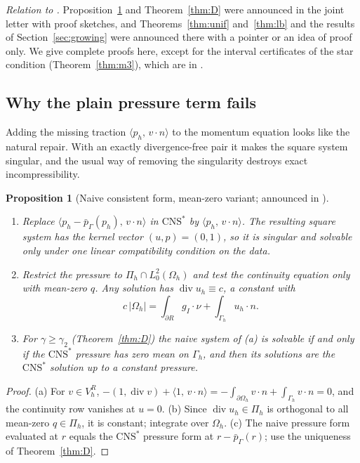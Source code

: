 \documentclass[pdflatex,sn-mathphys-num]{sn-jnl}
\theoremstyle{thmstyleone}
\newtheorem{proposition}[theorem]{Proposition}
\theoremstyle{thmstylethree}
\newcommand{\Gh}{\Gamma_h}
\newcommand{\Oh}{\Omega_h}
\newcommand{\VR}{V_h^R}
\newcommand{\Pih}{\Pi_h}
\newcommand{\gI}{g_I}
\newcommand{\pbG}{\bar p_{\Gamma}}
\newcommand{\ip}[2]{\langle #1,\, #2\rangle}
\newcommand{\CNS}{\mathrm{CNS}^\ast}
\renewcommand{\div}{\operatorname{div}}
\begin{document}
\emph{Relation to \cite{CavalcantePadhiLetter}.} Proposition~\ref{prop:singular} and Theorem~\ref{thm:D} were announced in the joint letter \cite{CavalcantePadhiLetter} with proof sketches, and Theorems~\ref{thm:unif} and~\ref{thm:lb} and the results of Section~\ref{sec:growing} were announced there with a pointer or an idea of proof only. We give complete proofs here, except for the interval certificates of the star condition (Theorem~\ref{thm:m3}), which are in \cite{PadhiExt}.

\subsection{Why the plain pressure term fails}
Adding the missing traction $\ip{p_h}{v\cdot n}$ to the momentum equation looks like the natural repair. With an exactly divergence-free pair it makes the square system singular, and the usual way of removing the singularity destroys exact incompressibility.

\begin{proposition}[Naive consistent form, mean-zero variant; announced in {\cite{CavalcantePadhiLetter}}]\label{prop:singular}
\begin{enumerate}[label=(\alph*)]
\item Replace $\ip{p_h-\pbG(p_h)}{v\cdot n}$ in $\CNS$ by $\ip{p_h}{v\cdot n}$. The resulting square system has the kernel vector $(u,p)=(0,1)$, so it is singular and solvable only under one linear compatibility condition on the data.
\item Restrict the pressure to $\Pih\cap L^2_0(\Oh)$ and test the continuity equation only with mean-zero $q$. Any solution has $\div u_h\equiv c$, a constant with
\[
c\,|\Oh|=\int_{\partial R}\gI\cdot\nu+\int_{\Gh}u_h\cdot n .
\]
\item For $\gamma\ge\gamma_2$ (Theorem~\ref{thm:D}) the naive system of (a) is solvable if and only if the $\CNS$ pressure has zero mean on $\Gh$, and then its solutions are the $\CNS$ solution up to a constant pressure.
\end{enumerate}
\end{proposition}

\begin{proof}
(a) For $v\in\VR$, $-(1,\div v)+\ip{1}{v\cdot n}=-\int_{\partial\Oh}v\cdot n+\int_{\Gh}v\cdot n=0$, and the continuity row vanishes at $u=0$. (b) Since $\div u_h\in\Pih$ is orthogonal to all mean-zero $q\in\Pih$, it is constant; integrate over $\Oh$. (c) The naive pressure form evaluated at $r$ equals the $\CNS$ pressure form at $r-\pbG(r)$; use the uniqueness of Theorem~\ref{thm:D}.
\end{proof}
\end{document}
